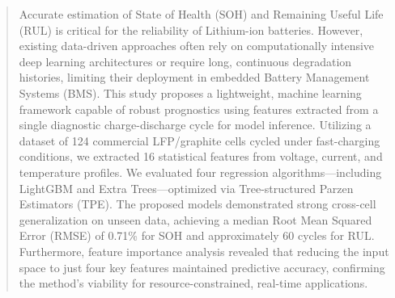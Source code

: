 \documentclass[preprint,12pt]{elsarticle}
\begin{document}
\begin{frontmatter}



\begin{abstract}
Accurate estimation of State of Health (SOH) and Remaining Useful Life (RUL) is critical for the reliability of Lithium-ion batteries. However, existing data-driven approaches often rely on computationally intensive deep learning architectures or require long, continuous degradation histories, limiting their deployment in embedded Battery Management Systems (BMS). This study proposes a lightweight, machine learning framework capable of robust prognostics using features extracted from a single diagnostic charge-discharge cycle for model inference. Utilizing a dataset of 124 commercial LFP/graphite cells cycled under fast-charging conditions, we extracted 16 statistical features from voltage, current, and temperature profiles. We evaluated four regression algorithms—including LightGBM and Extra Trees—optimized via Tree-structured Parzen Estimators (TPE). The proposed models demonstrated strong cross-cell generalization on unseen data, achieving a median Root Mean Squared Error (RMSE) of 0.71\% for SOH and approximately 60 cycles for RUL. Furthermore, feature importance analysis revealed that reducing the input space to just four key features maintained predictive accuracy, confirming the method's viability for resource-constrained, real-time applications.






\end{abstract}
\end{frontmatter}
\end{document}
